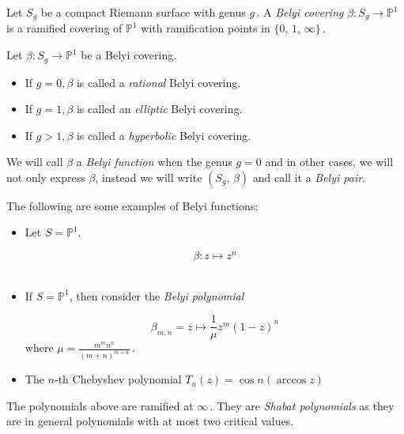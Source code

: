 \begin{dfn} Let $S_g$ be a compact Riemann surface with genus $g$\,. A {\it Belyi covering} $\beta: S_g \to \mathbb{P}^1$ is a ramified covering of $\mathbb{P}^1$ with ramification points in $\{0,\,1,\,\infty\}\,.$
\end{dfn}
\vskip5pt
\begin{dfn}
    Let  $\beta: S_{g} \rightarrow \mathbb{P}^{1}$ be a Belyi covering.
\begin{itemize}
    \item If $g=0, \beta$ is called a \textit{rational} Belyi covering.
    \item If $g=1, \beta$ is called an \textit{elliptic} Belyi covering.
    \item If $g>1, \beta$ is called a \textit{hyperbolic} Belyi covering.
\end{itemize}
\end{dfn}

\vskip5pt

\begin{dfn}
    We will call $\beta$ a {\it Belyi function} when the genus $g = 0$ and in other cases, we will not only express $\beta$, instead we will write $(S_g,\,\beta)$ and call it a {\it Belyi pair}.
\end{dfn}

\begin{example} The following are some examples of Belyi functions:
\vspace{0.1cm}
\begin{itemize}
\item  Let $S=\mathbb{P}^{1}$.

$$
\beta: z \mapsto z^{n}
$$ \\
\item If $S=\mathbb{P}^{1}$, then consider the \textit{Belyi polynomial}

$$
\beta_{m, n}=z \mapsto \frac{1}{\mu} z^{m}(1-z)^{n}
$$
where $\mu=\frac{m^{m} n^{n}}{(m+n)^{m+n}}\,.$ \\
\item The $n$-th Chebyshev polynomial 
$T_{n}(z)=\cos n(\arccos z)$

\end{itemize}
   
\end{example}

\begin{rem} The polynomials above are ramified at $\infty\,.$ They are \textit{Shabat polynomials} as they are in general polynomials with at most two critical values.
\end{rem}

